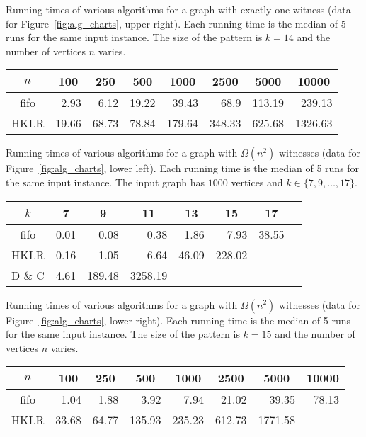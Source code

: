 \documentclass[11pt]{article}
\begin{document}
Running times of various algorithms for a graph with exactly one witness (data for Figure~\ref{fig:alg_charts}, upper right).
Each running time is the median of 5 runs for the same input instance.
The size of the pattern is $k=14$ and the number of vertices $n$ varies.

{\scriptsize
\begin{center}
\begin{tabular}{|c|r|r|r|r|r|r|r|}\hline
\multicolumn{1}{|c|}{$n$} & \multicolumn{1}{|c|}{100}  & \multicolumn{1}{|c|}{250}  & \multicolumn{1}{|c|}{500}  & \multicolumn{1}{|c|}{1000}  & \multicolumn{1}{|c|}{2500}  & \multicolumn{1}{|c|}{5000}  & \multicolumn{1}{|c|}{10000} \\\hline
fifo & 2.93 & 6.12 & 19.22 & 39.43 & 68.9 & 113.19 & 239.13\\
HKLR & 19.66 & 68.73 & 78.84 & 179.64 & 348.33 & 625.68 & 1326.63\\\hline
\end{tabular}
\end{center}
}

Running times of various algorithms for a graph with $\Omega(n^2)$ witnesses (data for Figure~\ref{fig:alg_charts}, lower left).
Each running time is the median of 5 runs for the same input instance.
The input graph has $1000$ vertices and $k\in\{7,9,\ldots,17\}$.


{\scriptsize
\begin{center}
\begin{tabular}{|c|r|r|r|r|r|r|r|}\hline
\multicolumn{1}{|c|}{$k$} & \multicolumn{1}{|c|}{7}  & \multicolumn{1}{|c|}{9}  & \multicolumn{1}{|c|}{11}  & \multicolumn{1}{|c|}{13}  & \multicolumn{1}{|c|}{15}  & \multicolumn{1}{|c|}{17} \\\hline
fifo & 0.01 & 0.08 & 0.38 & 1.86 & 7.93 & 38.55\\
HKLR & 0.16 & 1.05 & 6.64 & 46.09 & 228.02 & \\
D \& C & 4.61 & 189.48 & 3258.19& & &\\\hline
\end{tabular}
\end{center}
}

Running times of various algorithms for a graph with $\Omega(n^2)$ witnesses (data for Figure~\ref{fig:alg_charts}, lower right).
Each running time is the median of 5 runs for the same input instance.
The size of the pattern is $k=15$ and the number of vertices $n$ varies.



{\scriptsize
\begin{center}
\begin{tabular}{|c|r|r|r|r|r|r|r|}\hline
\multicolumn{1}{|c|}{$n$} & \multicolumn{1}{|c|}{100}  & \multicolumn{1}{|c|}{250}  & \multicolumn{1}{|c|}{500}  & \multicolumn{1}{|c|}{1000}  & \multicolumn{1}{|c|}{2500}  & \multicolumn{1}{|c|}{5000}  & \multicolumn{1}{|c|}{10000} \\\hline
fifo & 1.04 & 1.88 & 3.92 & 7.94 & 21.02 & 39.35 & 78.13\\
HKLR & 33.68 & 64.77 & 135.93 & 235.23 & 612.73 & 1771.58 &\\\hline
\end{tabular}
\end{center}
}
\end{document}
